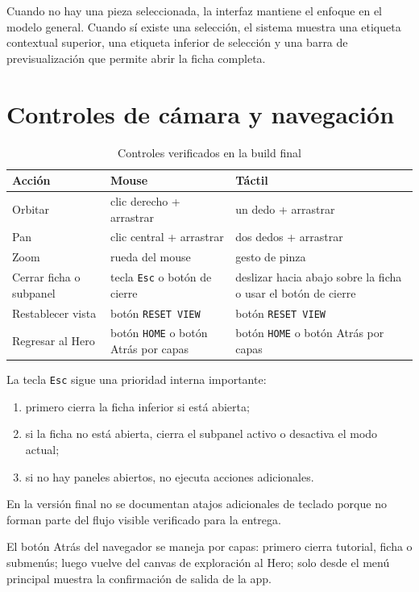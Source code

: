 \documentclass[12pt,letterpaper]{article}
\begin{document}
\noindent Cuando no hay una pieza seleccionada, la interfaz mantiene el enfoque en el modelo general. Cuando sí existe una selección, el sistema muestra una etiqueta contextual superior, una etiqueta inferior de selección y una barra de previsualización que permite abrir la ficha completa.

\section{Controles de cámara y navegación}

\begin{table}[htbp!]
\centering
\caption{Controles verificados en la build final}
\begin{tabular}{p{4.2cm}p{5.1cm}p{4.1cm}}
\toprule
\textbf{Acción} & \textbf{Mouse} & \textbf{Táctil} \\
\midrule
Orbitar & clic derecho + arrastrar & un dedo + arrastrar \\
Pan & clic central + arrastrar & dos dedos + arrastrar \\
Zoom & rueda del mouse & gesto de pinza \\
Cerrar ficha o subpanel & tecla \texttt{Esc} o botón de cierre & deslizar hacia abajo sobre la ficha o usar el botón de cierre \\
Restablecer vista & botón \texttt{RESET VIEW} & botón \texttt{RESET VIEW} \\
Regresar al Hero & botón \texttt{HOME} o botón Atrás por capas & botón \texttt{HOME} o botón Atrás por capas \\
\bottomrule
\end{tabular}
\end{table}

\noindent La tecla \texttt{Esc} sigue una prioridad interna importante:
\begin{enumerate}
    \item primero cierra la ficha inferior si está abierta;
    \item si la ficha no está abierta, cierra el subpanel activo o desactiva el modo actual;
    \item si no hay paneles abiertos, no ejecuta acciones adicionales.
\end{enumerate}

\noindent En la versión final no se documentan atajos adicionales de teclado porque no forman parte del flujo visible verificado para la entrega.

\noindent El botón Atrás del navegador se maneja por capas: primero cierra tutorial, ficha o submenús; luego vuelve del canvas de exploración al Hero; solo desde el menú principal muestra la confirmación de salida de la app.
\end{document}

